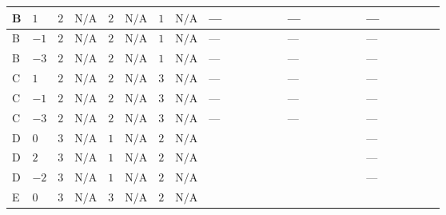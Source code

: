 \documentclass[8pt]{article}
\begin{document}
\begin{landscape}
\begin{longtable}{@{}llcccccc >{\raggedright\arraybackslash}p{0.21\linewidth} >{\raggedright\arraybackslash}p{0.21\linewidth} >{\raggedright\arraybackslash}p{0.21\linewidth}@{}}
\midrule
B & $1$ & $2$ & $\text{N/A}$ & $2$ & $\text{N/A}$ & $1$ & $\text{N/A}$ & --- & --- & --- \\
\midrule
B & $-1$ & $2$ & $\text{N/A}$ & $2$ & $\text{N/A}$ & $1$ & $\text{N/A}$ & --- & --- & --- \\
\midrule
B & $-3$ & $2$ & $\text{N/A}$ & $2$ & $\text{N/A}$ & $1$ & $\text{N/A}$ & --- & --- & --- \\
\midrule
C & $1$ & $2$ & $\text{N/A}$ & $2$ & $\text{N/A}$ & $3$ & $\text{N/A}$ & --- & --- & --- \\
\midrule
C & $-1$ & $2$ & $\text{N/A}$ & $2$ & $\text{N/A}$ & $3$ & $\text{N/A}$ & --- & --- & --- \\
\midrule
C & $-3$ & $2$ & $\text{N/A}$ & $2$ & $\text{N/A}$ & $3$ & $\text{N/A}$ & --- & --- & --- \\
\midrule
D & $0$ & $3$ & $\text{N/A}$ & $1$ & $\text{N/A}$ & $2$ & $\text{N/A}$ & \scriptsize\adjustbox{max width=\linewidth}{$\begin{gathered} +6 {g_2}^4\end{gathered}$} & \scriptsize\adjustbox{max width=\linewidth}{$\begin{gathered} +6 {\lambda_{HS_1}^{(A)}}^2\end{gathered}$} & --- \\
\midrule
D & $2$ & $3$ & $\text{N/A}$ & $1$ & $\text{N/A}$ & $2$ & $\text{N/A}$ & \scriptsize\adjustbox{max width=\linewidth}{$\begin{gathered} +6 {g_2}^4\end{gathered}$} & \scriptsize\adjustbox{max width=\linewidth}{$\begin{gathered} +6 {\lambda_{HS_1}^{(A)}}^2\end{gathered}$} & --- \\
\midrule
D & $-2$ & $3$ & $\text{N/A}$ & $1$ & $\text{N/A}$ & $2$ & $\text{N/A}$ & \scriptsize\adjustbox{max width=\linewidth}{$\begin{gathered} +6 {g_2}^4\end{gathered}$} & \scriptsize\adjustbox{max width=\linewidth}{$\begin{gathered} +6 {\lambda_{HS_1}^{(A)}}^2\end{gathered}$} & --- \\
\midrule
E & $0$ & $3$ & $\text{N/A}$ & $3$ & $\text{N/A}$ & $2$ & $\text{N/A}$ & \scriptsize\adjustbox{max width=\linewidth}{$\begin{gathered} +6 {g_2}^4\end{gathered}$} & \scriptsize\adjustbox{max width=\linewidth}{$\begin{gathered} +6 {\lambda_{HS_1}^{(A)}}^2\end{gathered}$} & \scriptsize\adjustbox{max width=\linewidth}{$\begin{gathered} +{\lambda_{HS_2}^{(1)}} (6 {\lambda_{12}^{(1)}}+4 {\lambda_{12}^{(\times)}})\end{gathered}$} \\

\end{longtable}
\end{landscape}
\end{document}
